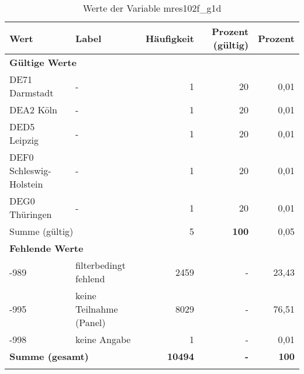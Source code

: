      \begin{longtable}{Xlrrr}
     \toprule
     \textbf{Wert} & \textbf{Label} & \textbf{Häufigkeit} & \textbf{Prozent (gültig)} & \textbf{Prozent} \\
     \endhead
     \midrule
     \multicolumn{5}{l}{\textbf{Gültige Werte}}\\

     \multicolumn{1}{X}{DE71 Darmstadt} &
     - &
     1 &
     20 &
     0,01 \\

     \multicolumn{1}{X}{DEA2 Köln} &
     - &
     1 &
     20 &
     0,01 \\

     \multicolumn{1}{X}{DED5 Leipzig} &
     - &
     1 &
     20 &
     0,01 \\

     \multicolumn{1}{X}{DEF0 Schleswig-Holstein} &
     - &
     1 &
     20 &
     0,01 \\

     \multicolumn{1}{X}{DEG0 Thüringen} &
     - &
     1 &
     20 &
     0,01 \\
     \midrule
      \multicolumn{2}{l}{Summe (gültig)} & 5 &
      \textbf{100} &
         0,05 \\
     \multicolumn{5}{l}{\textbf{Fehlende Werte}}\\
       -989 & filterbedingt fehlend & 2459 & - & 23,43 \\

       -995 & keine Teilnahme (Panel) & 8029 & - & 76,51 \\

       -998 & keine Angabe & 1 & - & 0,01 \\

     \midrule
     \multicolumn{2}{l}{\textbf{Summe (gesamt)}} & \textbf{10494} & \textbf{-} & \textbf{100} \\
     \bottomrule
     \caption{Werte der Variable mres102f\_g1d}
     \end{longtable}
     
